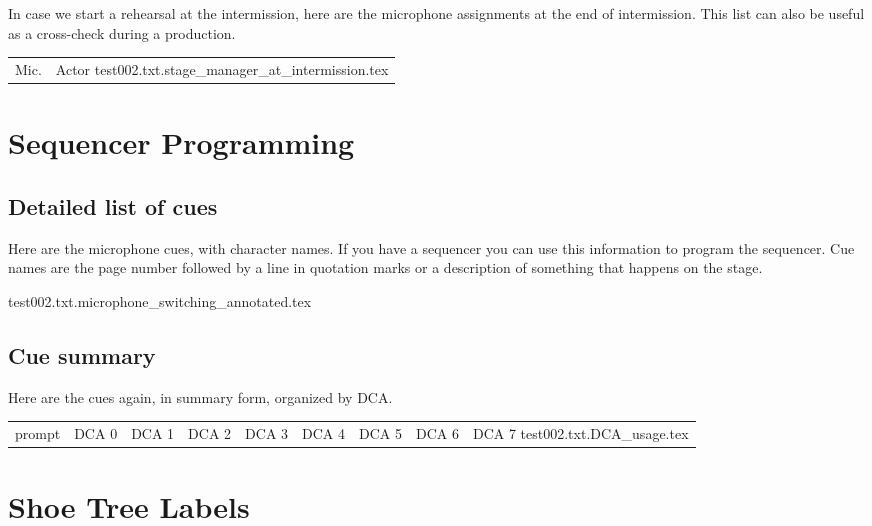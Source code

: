 \documentclass[letterpaper]{article}
\begin{document}
In case we start a rehearsal at the intermission, here are the microphone
assignments at the end of intermission.  This list can also be useful as a 
cross-check during a production.

\begin{center}
\begin{longtable}{|l|l|}
\hline Mic. & Actor \endhead \hline
 {test002.txt.stage_manager_at_intermission.tex}
\end{longtable}
\end{center}

\section {Sequencer Programming}

\subsection {Detailed list of cues}

Here are the microphone cues, with character names.  If you
have a sequencer you can use this information to program
the sequencer.  Cue names are the page number followed by a line
in quotation marks or a description of something that happens on
the stage.

 {test002.txt.microphone_switching_annotated.tex}

\subsection {Cue summary}

Here are the cues again, in summary form, organized by DCA.

\begin{center}
  \begin{longtable}{|p{0.75 in}|p{0.75 in}|p{0.75 in}|p{0.75 in}|p{0.75 in}|p{0.75 in}|p{0.75 in}|p{0.75 in}|p{0.75 in}|}    
    \hline prompt & DCA 0 & DCA 1 & DCA 2 & DCA 3 & DCA 4 & DCA 5 & DCA 6 & DCA 7\endhead \hline
     {test002.txt.DCA_usage.tex}
  \end{longtable}
\end{center}

\section {Shoe Tree Labels}
\end{document}
